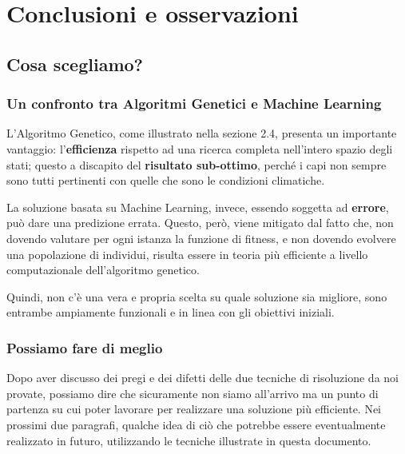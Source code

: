\documentclass[a4paper, 11pt, oneside]{report}
\begin{document}
    \part{Conclusioni e osservazioni}
        \chapter{Cosa scegliamo?}
            \section{Un confronto tra Algoritmi Genetici e Machine Learning}
                L'Algoritmo Genetico, come illustrato nella sezione 2.4, presenta un importante vantaggio: l'\textbf{efficienza}
                rispetto ad una ricerca completa nell'intero spazio degli stati; questo a discapito del \textbf{risultato sub-ottimo},
                perché i capi non sempre sono tutti pertinenti con quelle che sono le condizioni climatiche.
                \par \noindent La soluzione basata su Machine Learning, invece, essendo soggetta ad
                \textbf{errore}, può dare una predizione errata. Questo, però, viene mitigato dal fatto che, non dovendo valutare
                per ogni istanza la funzione di fitness, e non dovendo evolvere una popolazione di individui, risulta essere
                in teoria più efficiente a livello computazionale dell'algoritmo genetico.
                \par \noindent Quindi, non c'è una vera e propria scelta su quale soluzione sia migliore, sono entrambe
                ampiamente funzionali e in linea con gli obiettivi iniziali.
            \section{Possiamo fare di meglio}
                Dopo aver discusso dei pregi e dei difetti delle due tecniche di risoluzione da noi provate, possiamo dire
                che sicuramente non siamo all'arrivo ma un punto di partenza su cui poter lavorare per realizzare una soluzione
                più efficiente.
                Nei prossimi due paragrafi, qualche idea di ciò che potrebbe essere eventualmente realizzato in futuro,
                utilizzando le tecniche illustrate in questa documento.
\end{document}
